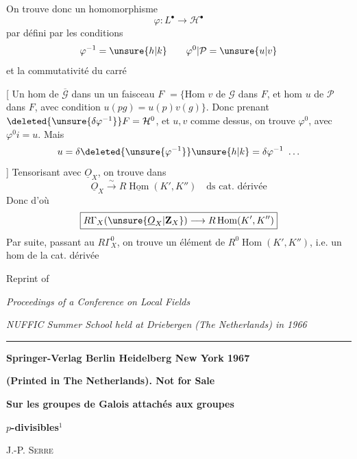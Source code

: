 On trouve donc un homomorphisme
\[
\varphi:L^\bullet\longrightarrow\mathcal H^\bullet
\]
par
défini par les conditions
\[
\varphi^{-1}=\unsure{h|k}\qquad\varphi^0\vert\mathcal P=\unsure{u|v}
\]
et la commutativité du carré

[ Un hom de $\overline{\mathcal G}$ dans un un faisceau $F$ $=\{$Hom $v$ de $\mathcal G$ dans $F$, et hom $u$ de $\mathcal P$ dans $F$, avec condition $u(pg)=u(p)v(g)\}$.
Donc prenant $\deleted{\unsure{\delta\varphi^{-1}}}F=\mathcal H^0$, et $u,v$ comme dessus, on trouve $\varphi^0$, avec $\varphi^0i=u$. Mais
\[
u=\delta\deleted{\unsure{\varphi^{-1}}}\unsure{h|k}=\delta\varphi^{-1}\ \ldots
\]
]
Tensorisant avec $\underline O_X$, on trouve
dans
\[
\boxed{\underline O_X\xrightarrow{\sim}R\underline{\operatorname{Hom}}(K',K'')\quad\text{ds cat. dérivée}}
\]
Donc
d'où
\[
\boxed{R\Gamma_X(\unsure{\underline O_X|\mathbf Z_X})\longrightarrow R\operatorname{Hom}(K',K'')}
\]
Par suite,  passant au $R\Gamma_X^0$, on trouve un élément de $R^0\operatorname{Hom}(K',K'')$, i.e. un hom de la cat. dérivée

\begin{center}
Reprint of

\textit{Proceedings of a Conference on Local Fields}

\textit{NUFFIC Summer School held at Driebergen (The Netherlands) in 1966}

\rule{0.85\linewidth}{0.4pt}

\textbf{Springer-Verlag Berlin Heidelberg New York 1967}

\textbf{(Printed in The Netherlands). Not for Sale}

\textbf{Sur les groupes de Galois attachés aux groupes}

\textbf{$p$-divisibles}$^{1}$

J.-P. \textsc{Serre}
\end{center}

